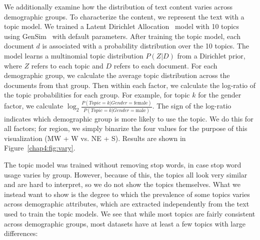 We additionally examine how the distribution of text content varies across demographic groups. To characterize the content, we represent the text with a topic model.
We trained a Latent Dirichlet Allocation~\cite{blei2003latent} model with 10 topics using GenSim~\cite{rehurek2010software} with default parameters.
After training the topic model, each document $d$ is associated with a probability distribution over the 10 topics. 
The model learns a multinomial topic distribution $P(Z|D)$ from a Dirichlet prior, where $Z$ refers to each topic and $D$ refers to each document.
For each demographic group, we calculate the average topic distribution across the documents from that group.
Then within each factor, we calculate the log-ratio of the topic probabilities for each group.
For example, for topic $k$ for the gender factor,
we calculate $\log_2 \frac{P(Topic=k|Gender=\textrm{female})}{P(Topic=k|Gender=\textrm{male})}$.
The sign of the log-ratio indicates which demographic group is more likely to use the topic.
We do this for all factors;
for region, we simply binarize the four values for the purpose of this visualization (MW + W vs. NE + S).
Results are shown in Figure~\ref{chap4:fig:vary}.

The topic model was trained without removing stop words, in case stop word usage varies by group.
However, because of this, the topics all look very similar and are hard to interpret, so we do not show the topics themselves.
What we instead want to show is the degree to which the prevalence of some topics varies across demographic attributes, which are extracted independently from the text used to train the topic models.
We see that while most topics are fairly consistent across demographic groups, most datasets have at least a few topics with large differences:


